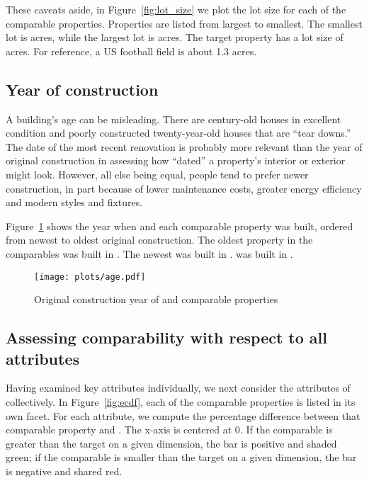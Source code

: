 \documentclass[
12pt, %
letterpaper, %
oneside, %
headinclude,footinclude, %
BCOR5mm, %
]{scrartcl}
\begin{document}
These caveats aside, in Figure~\ref{fig:lot_size} we plot the lot size for each of the comparable properties. 
Properties are listed from largest to smallest.
The smallest lot is \SmallestLot{} acres, while the largest lot is \LargestLot{} acres.
The target property has a lot size of \PropertyLotSize{} acres.
For reference, a US football field is about 1.3 acres.
\ExtremeWarningLargestLot{}
\ExtremeWarningSmallestLot{}

\subsection{Year of construction}
A building's age can be misleading. There are century-old houses in excellent condition and poorly constructed twenty-year-old houses that are ``tear downs.''
The date of the most recent renovation is probably more relevant than the year of original construction in assessing how ``dated'' a property's interior or exterior might look. 
However, all else being equal, people tend to prefer newer construction, in part because of lower maintenance costs, greater energy efficiency and modern styles and fixtures.

Figure~\ref{fig:age} shows the year when \PropertyName{} and each comparable property was built, ordered from newest to oldest original construction.
The oldest property in the comparables was built in \Oldest{}. The newest was built in \Youngest{}.
\PropertyName{} was built in \PropertyYearBuilt{}. 
\ExtremeWarningAgeYoung{}
\ExtremeWarningAgeOld{}

\begin{figure}
\centering
\caption{Original construction year of \PropertyName{} and comparable properties} \label{fig:age}  
\texttt{[image: plots/age.pdf]} 
\end{figure}

\subsection{Assessing comparability with respect to all attributes}

Having examined key attributes individually, we next consider the attributes of \PropertyName{} collectively.
In Figure~\ref{fig:ecdf}, each of the comparable properties is listed in its own facet.
For each attribute, we compute the percentage difference between that comparable property and \PropertyName{}.
The x-axis is centered at 0.  
If the comparable is greater than the target on a given dimension, the bar is positive and shaded green;
if the comparable is smaller than the target on a given dimension, the bar is negative and shared red. 
\end{document}
